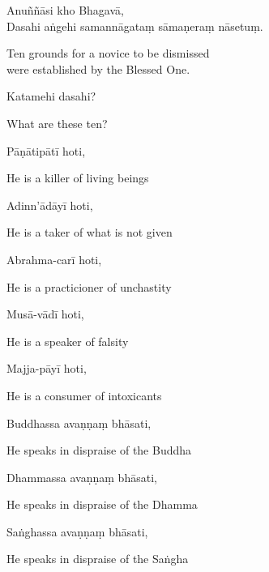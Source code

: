 
Anuññāsi kho Bhagavā,\\
Dasahi aṅgehi samannāgataṃ sāmaṇeraṃ nāsetuṃ.\\

\begin{english}
  Ten grounds for a novice to be dismissed\\
  were established by the Blessed One.
\end{english}

Katamehi dasahi?

\begin{english}
  What are these ten?
\end{english}

Pāṇātipātī hoti,

\begin{english}
  He is a killer of living beings
\end{english}

Adinn'ādāyī hoti,

\begin{english}
  He is a taker of what is not given
\end{english}

Abrahma-carī hoti,

\begin{english}
  He is a practicioner of unchastity
\end{english}

Musā-vādī hoti,

\begin{english}
  He is a speaker of falsity
\end{english}

Majja-pāyī hoti,

\begin{english}
  He is a consumer of intoxicants
\end{english}

Buddhassa avaṇṇaṃ bhāsati,

\begin{english}
  He speaks in dispraise of the Buddha
\end{english}

Dhammassa avaṇṇaṃ bhāsati,

\begin{english}
  He speaks in dispraise of the Dhamma
\end{english}

Saṅghassa avaṇṇaṃ bhāsati,

\begin{english}
  He speaks in dispraise of the Saṅgha
\end{english}

